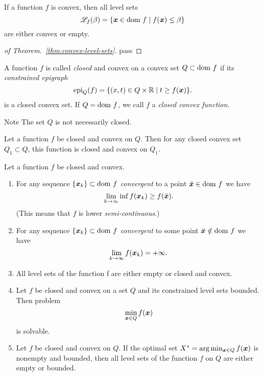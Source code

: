 \begin{thm}\label{thm:convex-level-sets}
    If a function $f$ is convex, then all level sets
    \[
        \mathscr{L}_f(\beta) = \left\{ \bm{x} \in \mathrm{dom}~ f \mid f(\bm{x}) \le \beta \right\}
    \]
    are either convex or empty.
\end{thm}
\begin{proof}[of Theorem.~\ref{thm:convex-level-sets}]
    pass
\end{proof}

\begin{defn}\label{defn:closed-func}
    A function \(f\) is called \emph{closed} and convex on a convex set \(Q \subset \mathrm{dom}~ f\) if its 
    \emph{constrained epigraph}
    \[
        \mathrm{epi}_Q(f) = \{ (x, t) \in Q \times \mathbb{R} \mid t \ge f(\bm{x}) \}.  
    \]
    is a closed convex set. If \(Q = \mathrm{dom}~ f\), we call \(f\) a \emph{closed convex function}.
\end{defn}

\begin{note}{Note}
    The set \(Q\) is not necessarily closed.
\end{note}

\begin{lemma}
    Let a function $f$ be closed and convex on \(Q\). Then for any closed convex set \(Q_1 \subset Q\), this function is closed and convex on \(Q_1\).
\end{lemma}

\begin{thm}
    Let a function \(f\) be closed and convex.
    \begin{enumerate}
        \item {
            For any sequence \(\{\bm{x}_k\} \subset \mathrm{dom}~ f\) \emph{convergent} to a point \(\bar{\bm{x}} \in \mathrm{dom}~ f\) we have
            \[
                \lim_{k \to \infty}\inf   f(\bm{x}_k) \ge f(\bar{\bm{x}}).
            \]
            (This means that \(f\) is lower \emph{semi-continuous}.)
        }
        \item {
            For any sequence \(\{\bm{x}_k\} \subset \mathrm{dom}~ f\) \emph{convergent} to some point \(\bar{\bm{x}} \notin \mathrm{dom}~ f\) we have
            \[
                \lim_{k \to \infty} f(\bm{x}_k) = +\infty.  
            \]
        } 
        \item {
            All level sets of the function f are either empty or closed and convex.
        }
        \item {
            Let \(f\) be closed and convex on a set \(Q\) and its constrained level sets bounded. Then problem
            \[
                \min_{\bm{x} \in Q} f(\bm{x})  
            \]
            is solvable.
        }
        \item {
            Let \(f\) be closed and convex on \(Q\). If the optimal set \(X^* = \arg\min_{\bm{x} \in Q}f(\bm{x})\) is nonempty and bounded,
            then all level sets of the function \(f\) on \(Q\) are either empty or bounded.
        }
    \end{enumerate}
\end{thm}

